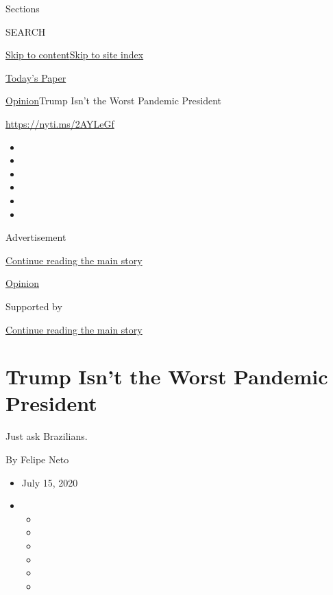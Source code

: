 Sections

SEARCH

\protect\hyperlink{site-content}{Skip to
content}\protect\hyperlink{site-index}{Skip to site index}

\href{https://myaccount.nytimes.com/auth/login?response_type=cookie\&client_id=vi}{}

\href{https://www.nytimes.com/section/todayspaper}{Today's Paper}

\href{/section/opinion}{Opinion}\textbar{}Trump Isn't the Worst Pandemic
President

\url{https://nyti.ms/2AYLeGf}

\begin{itemize}
\item
\item
\item
\item
\item
\item
\end{itemize}

Advertisement

\protect\hyperlink{after-top}{Continue reading the main story}

\href{/section/opinion}{Opinion}

Supported by

\protect\hyperlink{after-sponsor}{Continue reading the main story}

\hypertarget{trump-isnt-the-worst-pandemic-president}{%
\section{Trump Isn't the Worst Pandemic
President}\label{trump-isnt-the-worst-pandemic-president}}

Just ask Brazilians.

By Felipe Neto

\begin{itemize}
\item
  July 15, 2020
\item
  \begin{itemize}
  \item
  \item
  \item
  \item
  \item
  \item
  \end{itemize}
\end{itemize}

